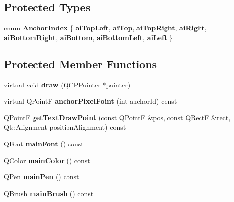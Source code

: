 \subsection*{Protected Types}
\begin{DoxyCompactItemize}
\item 
\mbox{\label{class_q_c_p_item_text_a14a84e58f72519c8ae1d7a4a1dd23f21}} 
enum {\bfseries Anchor\+Index} \{ \newline
{\bfseries ai\+Top\+Left}, 
{\bfseries ai\+Top}, 
{\bfseries ai\+Top\+Right}, 
{\bfseries ai\+Right}, 
\newline
{\bfseries ai\+Bottom\+Right}, 
{\bfseries ai\+Bottom}, 
{\bfseries ai\+Bottom\+Left}, 
{\bfseries ai\+Left}
 \}
\end{DoxyCompactItemize}
\subsection*{Protected Member Functions}
\begin{DoxyCompactItemize}
\item 
\mbox{\label{class_q_c_p_item_text_a8793adb271ab79b4cf391dc55e9987f1}} 
virtual void {\bfseries draw} (\mbox{\hyperlink{class_q_c_p_painter}{Q\+C\+P\+Painter}} $\ast$painter)
\item 
\mbox{\label{class_q_c_p_item_text_a3f999a0a7664421373601206bc35cc7c}} 
virtual Q\+PointF {\bfseries anchor\+Pixel\+Point} (int anchor\+Id) const
\item 
\mbox{\label{class_q_c_p_item_text_a4c76ad7e33c50aff0a60b8f38fe6060e}} 
Q\+PointF {\bfseries get\+Text\+Draw\+Point} (const Q\+PointF \&pos, const Q\+RectF \&rect, Qt\+::\+Alignment position\+Alignment) const
\item 
\mbox{\label{class_q_c_p_item_text_af30ac2a0b84afa86a1dec22ab48dd07d}} 
Q\+Font {\bfseries main\+Font} () const
\item 
\mbox{\label{class_q_c_p_item_text_abe3f10805baf62797cb91fd4a4464fcc}} 
Q\+Color {\bfseries main\+Color} () const
\item 
\mbox{\label{class_q_c_p_item_text_a2f67fcbb7ac10ea9a94c4ecc3b0f4dfc}} 
Q\+Pen {\bfseries main\+Pen} () const
\item 
\mbox{\label{class_q_c_p_item_text_acddddd3ce88cfc87ab57b1ec4b25acb9}} 
Q\+Brush {\bfseries main\+Brush} () const
\end{DoxyCompactItemize}
